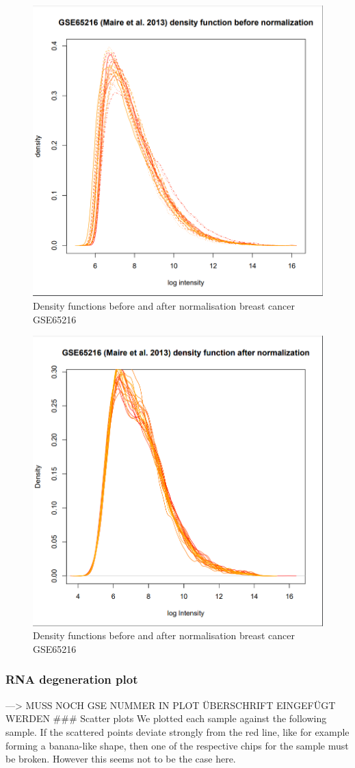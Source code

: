 \documentclass[
]{article}
\begin{document}
\begin{figure}

{\centering \includegraphics[width=0.5\linewidth]{images/breast_dflog_bfnorm} 

}

\caption{Density functions before and after normalisation breast cancer GSE65216}\label{fig:Density - breast qc-1}
\end{figure}
\begin{figure}

{\centering \includegraphics[width=0.5\linewidth]{images/breast_dflog_afnorm} 

}

\caption{Density functions before and after normalisation breast cancer GSE65216}\label{fig:Density - breast qc-2}
\end{figure}

\hypertarget{rna-degeneration-plot}{%
\subsubsection{RNA degeneration plot}\label{rna-degeneration-plot}}

---\textgreater{} MUSS NOCH GSE NUMMER IN PLOT ÜBERSCHRIFT EINGEFÜGT
WERDEN \#\#\# Scatter plots We plotted each sample against the following
sample. If the scattered points deviate strongly from the red line, like
for example forming a banana-like shape, then one of the respective
chips for the sample must be broken. However this seems not to be the
case here.
\end{document}
